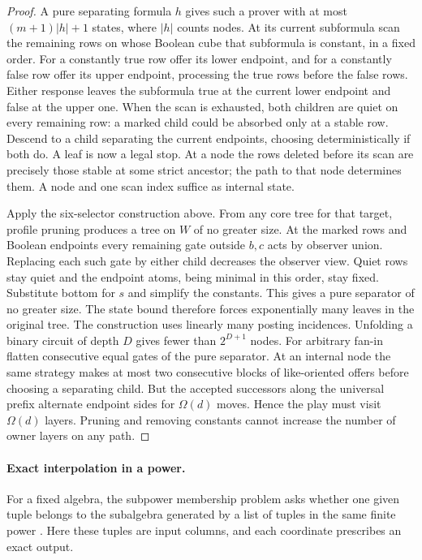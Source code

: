 \begin{proof}
A pure separating formula $h$ gives such a prover with at most
$(m+1)|h|+1$ states, where $|h|$ counts nodes. At its current
subformula scan the remaining rows on whose Boolean cube that
subformula is constant, in a fixed order. For a constantly true
row offer its lower endpoint, and for a constantly false row offer
its upper endpoint, processing the true rows before the false rows. Either response leaves the subformula true
at the current lower endpoint and false at the upper one. When
the scan is exhausted, both children are quiet on every remaining
row: a marked child could be absorbed only at a stable row.
Descend to a child separating the current endpoints, choosing
deterministically if both do. A leaf is now a legal stop. At a
node the rows deleted before its scan are precisely those stable
at some strict ancestor; the path to that node determines them.
A node and one scan index suffice as internal state.

Apply the six-selector construction above. From any core tree
for that target, profile pruning produces a tree on $W$ of no
greater size. At the marked rows and Boolean endpoints every
remaining gate outside $b,c$ acts by observer union. Replacing
each such gate by either child decreases the observer view.
Quiet rows stay quiet and the endpoint atoms, being minimal in
this order, stay fixed. Substitute bottom for $s$ and simplify
the constants. This gives a pure separator of no greater size.
The state bound therefore forces exponentially many leaves in the
original tree. The construction uses linearly many posting incidences. Unfolding
a binary circuit of depth $D$ gives
fewer than $2^{D+1}$ nodes. For arbitrary fan-in flatten consecutive
equal gates of the pure separator. At an internal node the same
strategy makes at most two consecutive blocks of like-oriented
offers before choosing a separating child. But the accepted
successors along the universal prefix alternate endpoint sides for
$\Omega(d)$ moves. Hence the play must visit $\Omega(d)$ layers.
Pruning and removing constants cannot increase the number of
owner layers on any path.
\end{proof}

\paragraph{Exact interpolation in a power.}
For a fixed algebra, the subpower membership problem asks whether one
given tuple belongs to the subalgebra generated by a list of tuples in
the same finite power \cite{BulatovMayrSzendrei2019}. Here these tuples
are input columns, and each coordinate prescribes an exact output.

